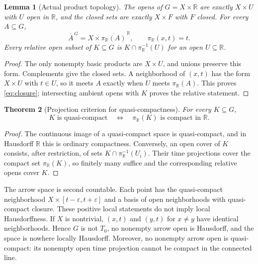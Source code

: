 \documentclass[11pt]{article}
\newtheorem{theorem}{Theorem}[section]
\newtheorem{lemma}[theorem]{Lemma}
\theoremstyle{definition}
\newcommand{\R}{\mathbb R}
\begin{document}
\begin{lemma}[Actual product topology]
\label{lem:topology}
The opens of $G=X\times\R$ are exactly $X\times U$ with $U$ open in
$\R$, and the closed sets are exactly $X\times F$ with $F$ closed.  For
every $A\subseteq G$,
\begin{equation}
 \overline A^{\,G}=X\times\overline{\pi_{\R}(A)}^{\,\R},
 \qquad \pi_{\R}(x,t)=t.
 \label{eq:closure}
\end{equation}
Every relative open subset of $K\subseteq G$ is
$K\cap\pi_{\R}^{-1}(U)$ for an open $U\subseteq\R$.
\end{lemma}

\begin{proof}
The only nonempty basic products are $X\times U$, and unions preserve this
form.  Complements give the closed sets.  A neighborhood of $(x,t)$ has the
form $X\times U$ with $t\in U$, so it meets $A$ exactly when $U$ meets
$\pi_{\R}(A)$.  This proves \cref{eq:closure}; intersecting ambient opens with
$K$ proves the relative statement.
\end{proof}

\begin{theorem}[Projection criterion for quasi-compactness]
\label{thm:qc}
For every $K\subseteq G$,
\begin{equation}
 K\text{ is quasi-compact}\quad\Longleftrightarrow\quad
 \pi_{\R}(K)\text{ is compact in }\R.
 \label{eq:qc}
\end{equation}
\end{theorem}

\begin{proof}
The continuous image of a quasi-compact space is quasi-compact, and in
Hausdorff $\R$ this is ordinary compactness.  Conversely, an open cover of
$K$ consists, after restriction, of sets
$K\cap\pi_{\R}^{-1}(U_i)$.  Their time projections cover the compact set
$\pi_{\R}(K)$, so finitely many suffice and the corresponding relative opens
cover $K$.
\end{proof}

The arrow space is second countable.  Each point has the quasi-compact
neighborhood $X\times[t-\varepsilon,t+\varepsilon]$ and a basis of open
neighborhoods with quasi-compact closure.  These positive local statements
do not imply local Hausdorffness.  If $X$ is nontrivial, $(x,t)$ and $(y,t)$
for $x\ne y$ have identical neighborhoods.  Hence $G$ is not $T_0$, no
nonempty arrow open is Hausdorff, and the space is nowhere locally
Hausdorff.  Moreover, no nonempty arrow open is quasi-compact: its nonempty
open time projection cannot be compact in the connected line.
\end{document}
